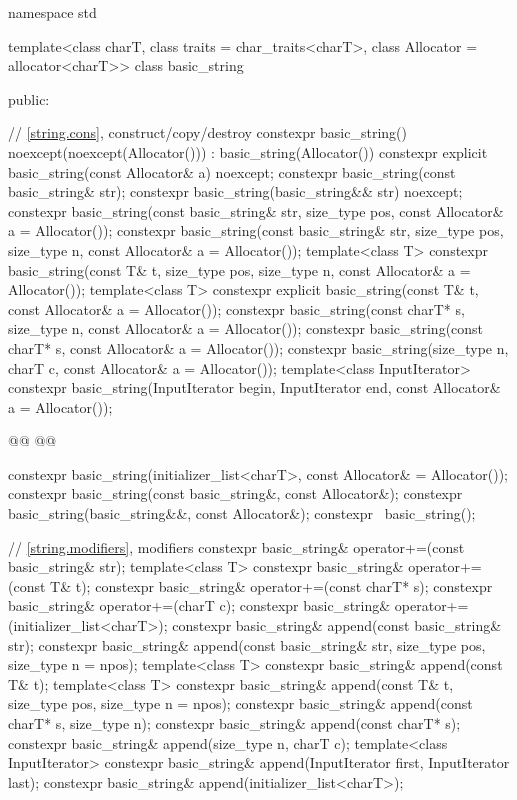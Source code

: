\documentclass{wg21}
\begin{document}
\begin{codeblock}
namespace std {
    template<class charT, class traits = char_traits<charT>, class Allocator = allocator<charT>>
    class basic_string {
        public:

        // \ref{string.cons}, construct/copy/destroy
        constexpr basic_string() noexcept(noexcept(Allocator())) : basic_string(Allocator()) { }
        constexpr explicit basic_string(const Allocator& a) noexcept;
        constexpr basic_string(const basic_string& str);
        constexpr basic_string(basic_string&& str) noexcept;
        constexpr basic_string(const basic_string& str, size_type pos,
        const Allocator& a = Allocator());
        constexpr basic_string(const basic_string& str, size_type pos, size_type n,
        const Allocator& a = Allocator());
        template<class T>
        constexpr basic_string(const T& t, size_type pos, size_type n,
        const Allocator& a = Allocator());
        template<class T>
        constexpr explicit basic_string(const T& t, const Allocator& a = Allocator());
        constexpr basic_string(const charT* s, size_type n, const Allocator& a = Allocator());
        constexpr basic_string(const charT* s, const Allocator& a = Allocator());
        constexpr basic_string(size_type n, charT c, const Allocator& a = Allocator());
        template<class InputIterator>
        constexpr basic_string(InputIterator begin, InputIterator end, const Allocator& a = Allocator());

        @@
        @@

        constexpr basic_string(initializer_list<charT>, const Allocator& = Allocator());
        constexpr basic_string(const basic_string&, const Allocator&);
        constexpr basic_string(basic_string&&, const Allocator&);
        constexpr ~basic_string();

        // \ref{string.modifiers}, modifiers
        constexpr basic_string& operator+=(const basic_string& str);
        template<class T>
        constexpr basic_string& operator+=(const T& t);
        constexpr basic_string& operator+=(const charT* s);
        constexpr basic_string& operator+=(charT c);
        constexpr basic_string& operator+=(initializer_list<charT>);
        constexpr basic_string& append(const basic_string& str);
        constexpr basic_string& append(const basic_string& str, size_type pos, size_type n = npos);
        template<class T>
        constexpr basic_string& append(const T& t);
        template<class T>
        constexpr basic_string& append(const T& t, size_type pos, size_type n = npos);
        constexpr basic_string& append(const charT* s, size_type n);
        constexpr basic_string& append(const charT* s);
        constexpr basic_string& append(size_type n, charT c);
        template<class InputIterator>
        constexpr basic_string& append(InputIterator first, InputIterator last);
        constexpr basic_string& append(initializer_list<charT>);

}}
\end{codeblock}
\end{document}
